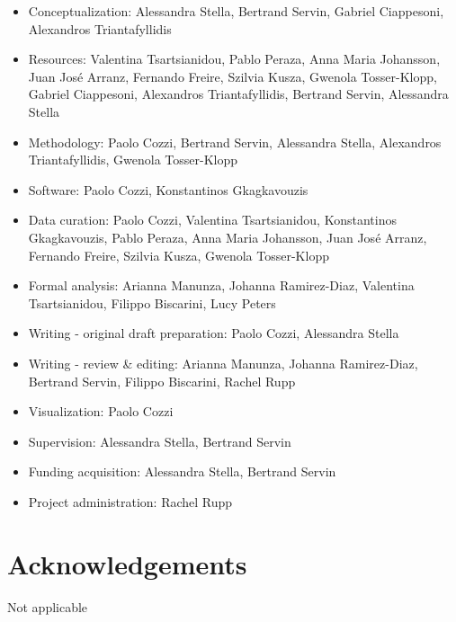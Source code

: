 \documentclass[a4paper,num-refs,gigabyte]{oup-contemporary}
\begin{document}
\begin{itemize}
\item Conceptualization: Alessandra Stella, Bertrand Servin, Gabriel Ciappesoni, Alexandros Triantafyllidis
\item Resources: Valentina Tsartsianidou, Pablo Peraza, {Anna Maria} Johansson, {Juan José} Arranz, Fernando Freire, Szilvia Kusza, Gwenola Tosser-Klopp, Gabriel Ciappesoni, Alexandros Triantafyllidis, Bertrand Servin, Alessandra Stella
\item Methodology: Paolo Cozzi, Bertrand Servin, Alessandra Stella, Alexandros Triantafyllidis, Gwenola Tosser-Klopp
\item Software: Paolo Cozzi, Konstantinos Gkagkavouzis
\item Data curation: Paolo Cozzi, Valentina Tsartsianidou, Konstantinos Gkagkavouzis, Pablo Peraza, {Anna Maria} Johansson, {Juan José} Arranz, Fernando Freire, Szilvia Kusza, Gwenola Tosser-Klopp
\item Formal analysis: Arianna Manunza, Johanna Ramirez-Diaz, Valentina Tsartsianidou, Filippo Biscarini, Lucy Peters
\item Writing - original draft preparation: Paolo Cozzi, Alessandra Stella
\item Writing - review \& editing: Arianna Manunza, Johanna Ramirez-Diaz, Bertrand Servin, Filippo Biscarini, Rachel Rupp
\item Visualization: Paolo Cozzi
\item Supervision: Alessandra Stella, Bertrand Servin
\item Funding acquisition: Alessandra Stella, Bertrand Servin
\item Project administration: Rachel Rupp
\end{itemize}

\section{Acknowledgements}

Not applicable


\end{document}
